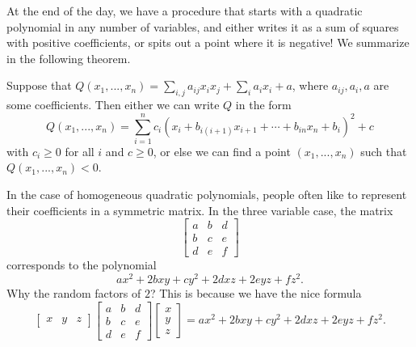 At the end of the day, we have a procedure that starts with a quadratic polynomial in any number of variables, and either writes it as a sum of squares with positive coefficients, or spits out a point where it is negative! We summarize in the following theorem.

\begin{thm} Suppose that $Q(x_1, ..., x_n) = \sum_{i,j} a_{ij} x_ix_j + \sum_i a_ix_i + a$, where $a_{ij}, a_i, a$ are some coefficients. Then either we can write $Q$ in the form
\[
Q(x_1, ..., x_n) = \sum_{i=1}^n c_i(x_i + b_{i(i+1)}x_{i+1} + \cdots + b_{in}x_n + b_i)^2 + c
\]
with $c_i \ge 0$ for all $i$ and $c \ge 0$, or else we can find a point $(x_1, ..., x_n)$ such that $Q(x_1, ..., x_n) < 0$.
\end{thm}

In the case of homogeneous quadratic polynomials, people often like to represent their coefficients in a symmetric matrix. In the three variable case, the matrix
\[
\begin{bmatrix} a & b & d\\
b & c & e\\
d & e & f
\end{bmatrix}
\]
corresponds to the polynomial
\[
ax^2 + 2bxy + cy^2 + 2dxz + 2eyz + fz^2.
\]
Why the random factors of $2$? This is because we have the nice formula
\[
\begin{bmatrix} x & y & z \end{bmatrix} \begin{bmatrix} a & b & d\\ b & c & e\\ d & e & f \end{bmatrix} \begin{bmatrix} x\\ y\\ z\end{bmatrix} = ax^2 + 2bxy + cy^2 + 2dxz + 2eyz + fz^2.
\]

